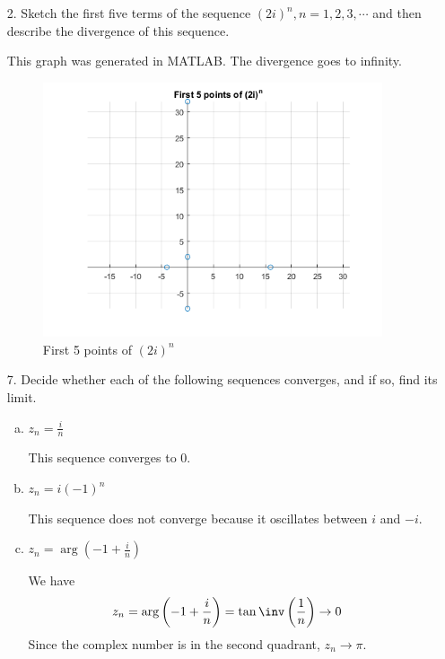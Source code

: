 \documentclass{article}
\begin{document}
\begin{itemize}
	\item[2.] Sketch the first five terms of the sequence $(2i)^n, n=1, 2, 3, \cdots$ and then describe the divergence of this sequence.
		\begin{soln}
			This graph was generated in MATLAB. The divergence goes to infinity.
			\begin{figure}[H]
				\centering
				\includegraphics[width=10cm]{seq}
				\caption{First 5 points of $(2i)^n$}
			\end{figure}
			
		\end{soln}

	\item[7.] Decide whether each of the following sequences converges, and if so, find its limit.
		\begin{enumerate}[(a)]
			\item $z_n=\frac{i}{n}$
				\begin{soln}
					This sequence converges to 0.
				\end{soln}

			\item $z_n=i(-1)^n$
				\begin{soln}
					This sequence does not converge because it oscillates between $i$ and $-i.$
				\end{soln}

			\item $z_n=\arg\left( -1+\frac{i}{n} \right)$
				\begin{soln}
					We have 
					\begin{align*}
						z_n &= \arg\left( -1+\frac{i}{n} \right) = \tan\inv\left( \frac{1}{n} \right) \to 0
					\end{align*}
					Since the complex number is in the second quadrant, $z_n\to \pi.$
				\end{soln}


\end{enumerate}
\end{itemize}
\end{document}
